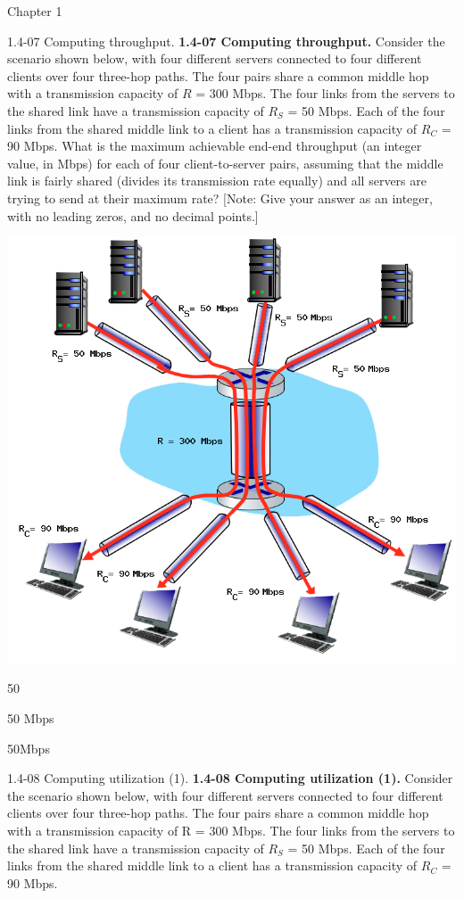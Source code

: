 \documentclass[a4paper]{article}
\begin{document}
\begin{quiz}{Chapter 1}
\begin{shortanswer}[points=1,shuffle=true]{1.4-07 Computing throughput.}
\textbf{1.4-07 Computing throughput.} 
Consider the scenario shown below, with four different servers connected to four different clients over four three-hop paths. The four pairs share a common middle hop with a transmission capacity of $R$ = 300 Mbps. The four links from the servers to the shared link have a transmission capacity of $R_S$ = 50 Mbps. Each of the four links from the shared middle link to a client has a transmission capacity of $R_C$ = 90 Mbps. What is the maximum achievable end-end throughput (an integer value, in Mbps) for each of four client-to-server pairs, assuming that the middle link is fairly shared (divides its transmission rate equally) and all servers are trying to send at their maximum rate? 
[Note: Give your answer as an integer, with no leading zeros, and no decimal points.] 
\begin{center}
\includegraphics[width=.7\linewidth]{figs/1.4.7.png}
\end{center}
\item 50
\item 50 Mbps
\item 50Mbps
\end{shortanswer}

\begin{shortanswer}[points=1,shuffle=true]{1.4-08 Computing utilization (1).}
\textbf{1.4-08 Computing utilization (1).} 
Consider the scenario shown below, with four different servers connected to four different clients over four three-hop paths. The four pairs share a common middle hop with a transmission capacity of R = 300 Mbps. The four links from the servers to the shared link have a transmission capacity of $R_S$ = 50 Mbps. Each of the four links from the shared middle link to a client has a transmission capacity of $R_C$ = 90 Mbps. 


\end{shortanswer}
\end{quiz}
\end{document}
